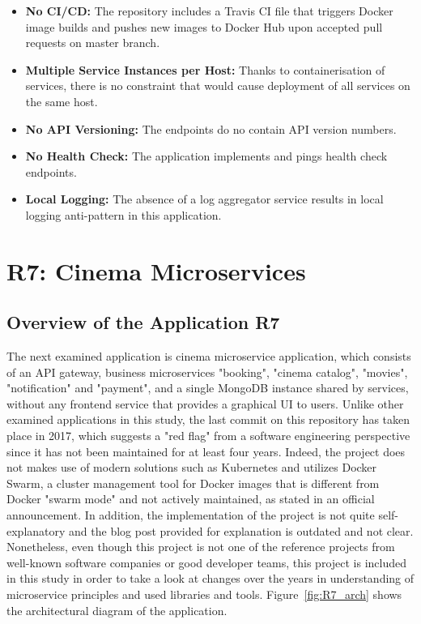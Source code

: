 \documentclass{Configuration_Files/PoliMi3i_thesis}
\begin{document}
\begin{itemize}
    \item \textbf{No CI/CD:} The repository includes a Travis CI file that triggers Docker image builds and pushes new images to Docker Hub upon accepted pull requests on master branch.
    
    \item \textbf{Multiple Service Instances per Host:} Thanks to containerisation of services, there is no constraint that would cause deployment of all services on the same host.
    
    \item \textbf{No API Versioning:} The endpoints do no contain API version numbers.
    
    \item \textbf{No Health Check:} The application implements and pings health check endpoints.
    
    \item \textbf{Local Logging:} The absence of a log aggregator service results in local logging anti-pattern in this application.
\end{itemize}

\section{R7: Cinema Microservices}
\label{sec:R7}

\subsection{Overview of the Application R7}
\label{subsec:R7_overview}

The next examined application is cinema microservice application, which consists of an API gateway, business microservices "booking", "cinema catalog", "movies", "notification" and "payment", and a single MongoDB instance shared by services, without any frontend service that provides a graphical UI to users.
Unlike other examined applications in this study, the last commit on this repository has taken place in 2017, which suggests a "red flag" from a software engineering perspective since it has not been maintained for at least four years.
Indeed, the project does not makes use of modern solutions such as Kubernetes and utilizes Docker Swarm, a cluster management tool for Docker images that is different from Docker "swarm mode" and not actively maintained, as stated in an official announcement\footnotemark[100].
In addition, the implementation of the project is not quite self-explanatory and the blog post provided for explanation is outdated and not clear.
Nonetheless, even though this project is not one of the reference projects from well-known software companies or good developer teams, this project is included in this study in order to take a look at changes over the years in understanding of microservice principles and used libraries and tools.
Figure~\ref{fig:R7_arch} shows the architectural diagram of the application.
\end{document}
